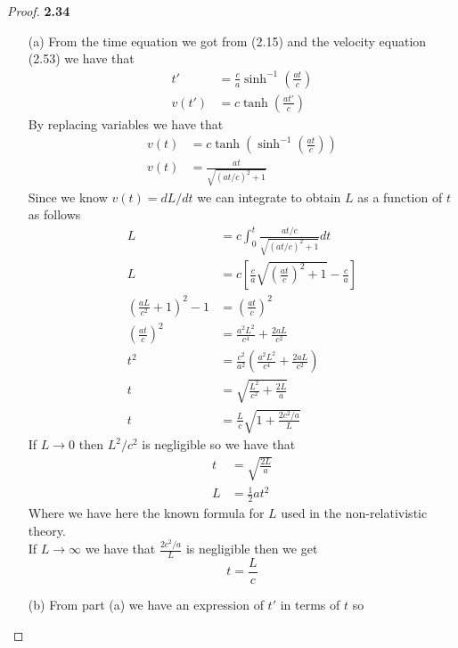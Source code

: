 \documentclass[11pt]{article}
\theoremstyle{definition}
\begin{document}
	\begin{proof}{\textbf{2.34}}
        \begin{itemize}
            \item [(a)] From the time equation we got from (2.15) and the velocity
            equation (2.53) we have that
            \begin{align*}
                t' &= \frac{c}{a}\sinh^{-1}\left(\frac{at}{c}\right)\\
                v(t') &= c\tanh(\frac{at'}{c})
            \end{align*}
            By replacing variables we have that
            \begin{align*}
                v(t) &= c\tanh(\sinh^{-1}\left(\frac{at}{c}\right))\\
                v(t) &= \frac{at}{\sqrt{(at/c)^2 + 1}}
            \end{align*}
            Since we know $v(t) = dL/dt$ we can integrate to obtain $L$ as a function
            of $t$ as follows
            \begin{align*}
                L &= c\int_0^t \frac{at/c}{\sqrt{(at/c)^2 + 1}} dt\\
                L &= c\left[\frac{c}{a}\sqrt{\left(\frac{at}{c}\right)^2 + 1} - \frac{c}{a}\right]\\
                \left(\frac{aL}{c^2} + 1\right)^2 - 1 &= \left(\frac{at}{c}\right)^2 \\
                \left(\frac{at}{c}\right)^2 &= \frac{a^2L^2}{c^4} + \frac{2aL}{c^2}\\
                t^2 &= \frac{c^2}{a^2}\left(\frac{a^2L^2}{c^4} + \frac{2aL}{c^2}\right) \\
                t &= \sqrt{\frac{L^2}{c^2} + \frac{2L}{a}}\\
                t &= \frac{L}{c}\sqrt{1 + \frac{2c^2/a}{L}}
            \end{align*}
            If $L \to 0$ then $L^2/c^2$ is negligible so we have that 
            \begin{align*}
                t &= \sqrt{\frac{2L}{a}}\\
                L &=\frac{1}{2}at^2
            \end{align*}
            Where we have here the known formula for $L$ used in the non-relativistic
            theory.\\
            If $L \to \infty$ we have that $\frac{2c^2/a}{L}$ is negligible then we get
            $$t = \frac{L}{c}$$
            \item [(b)] From part (a) we have an expression of $t'$ in terms of $t$ so

\end{itemize}
\end{proof}
\end{document}
